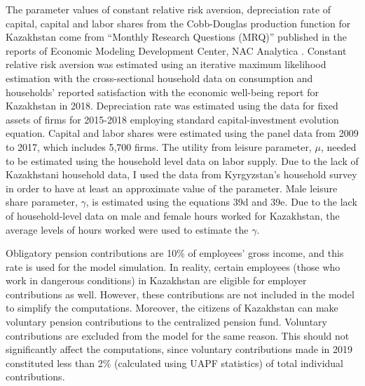 \documentclass[ProjectUYA]{subfiles}
\begin{document}
The parameter values of constant relative risk aversion, depreciation rate of capital, capital and labor shares from the Cobb-Douglas production function for Kazakhstan come from “Monthly Research Questions (MRQ)” published in the reports of Economic Modeling Development Center, NAC Analytica \cite{adilkhanova}. Constant relative risk aversion was estimated using an iterative maximum likelihood estimation with the cross-sectional household data on consumption and households’ reported satisfaction with the economic well-being report for Kazakhstan in 2018. Depreciation rate was estimated using the data for fixed assets of firms for 2015-2018 employing standard capital-investment evolution equation. Capital and labor shares were estimated using the panel data from 2009 to 2017, which includes 5,700 firms. The utility from leisure parameter, $\mu$, needed to be estimated using the household level data on labor supply.
Due to the lack of Kazakhstani household data, I used the data from Kyrgyzstan's household survey in order to have at least an approximate value of the parameter. Male leisure share parameter, $\gamma$, is estimated using the equations 39d and 39e. Due to the lack of household-level data on male and female hours worked for Kazakhstan, the average levels of hours worked were used to estimate the $\gamma$. 

Obligatory pension contributions are 10\% of employees’ gross income, and this rate is used for the model simulation. In reality, certain employees (those who work in dangerous conditions) in Kazakhstan are eligible for employer contributions as well. However, these contributions are not included in the model to simplify the computations. Moreover, the citizens of Kazakhstan can make voluntary pension contributions to the centralized pension fund. Voluntary contributions are excluded from the model for the same reason. This should not significantly affect the computations, since voluntary contributions made in 2019 constituted less than 2\% (calculated using UAPF statistics) of total individual contributions.



\onlyinsubfile{}
\end{document}

